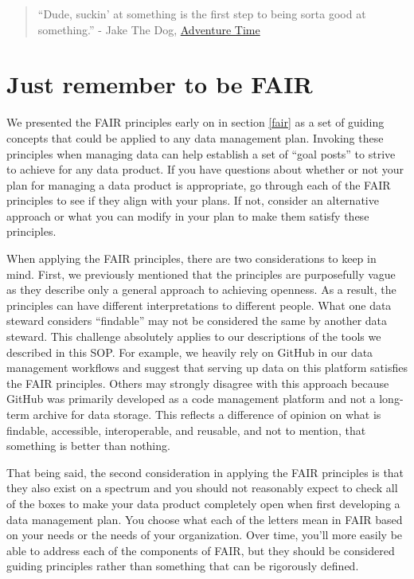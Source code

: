 \documentclass[
]{book}
\begin{document}
\begin{quote}
``Dude, suckin' at something is the first step to being sorta good at something.'' - Jake The Dog, \href{https://en.wikipedia.org/wiki/Adventure_Time}{Adventure Time}
\end{quote}

\hypertarget{just-remember-to-be-fair}{%
\section{Just remember to be FAIR}\label{just-remember-to-be-fair}}

We presented the FAIR principles early on in section \ref{fair} as a set of guiding concepts that could be applied to any data management plan. Invoking these principles when managing data can help establish a set of ``goal posts'' to strive to achieve for any data product. If you have questions about whether or not your plan for managing a data product is appropriate, go through each of the FAIR principles to see if they align with your plans. If not, consider an alternative approach or what you can modify in your plan to make them satisfy these principles.

When applying the FAIR principles, there are two considerations to keep in mind. First, we previously mentioned that the principles are purposefully vague as they describe only a general approach to achieving openness. As a result, the principles can have different interpretations to different people. What one data steward considers ``findable'' may not be considered the same by another data steward. This challenge absolutely applies to our descriptions of the tools we described in this SOP. For example, we heavily rely on GitHub in our data management workflows and suggest that serving up data on this platform satisfies the FAIR principles. Others may strongly disagree with this approach because GitHub was primarily developed as a code management platform and not a long-term archive for data storage. This reflects a difference of opinion on what is findable, accessible, interoperable, and reusable, and not to mention, that something is better than nothing.

That being said, the second consideration in applying the FAIR principles is that they also exist on a spectrum and you should not reasonably expect to check all of the boxes to make your data product completely open when first developing a data management plan. You choose what each of the letters mean in FAIR based on your needs or the needs of your organization. Over time, you'll more easily be able to address each of the components of FAIR, but they should be considered guiding principles rather than something that can be rigorously defined.
\end{document}
